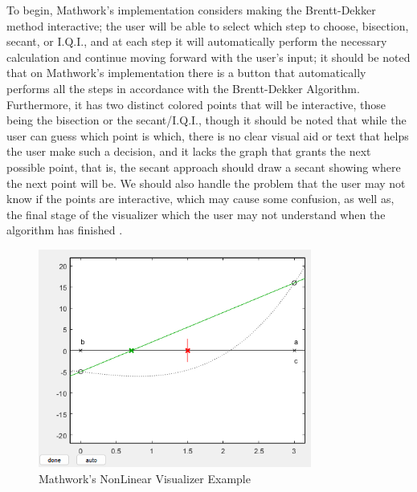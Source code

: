 To begin, Mathwork's implementation considers making the Brentt-Dekker method interactive; the user will be able to select which step to choose, bisection, secant, or I.Q.I., and at each step it will automatically perform the necessary calculation and continue moving forward with the user's input; it should be noted that on Mathwork's implementation there is a button that automatically performs all the steps in accordance with the Brentt-Dekker Algorithm. Furthermore, it has two distinct colored points that will be interactive, those being the bisection or the secant/I.Q.I., though it should be noted that while the user can guess which point is which, there is no clear visual aid or text that helps the user make such a decision, and it lacks the graph that grants the next possible point, that is, the secant approach should draw a secant showing where the next point will be. We should also handle the problem that the user may not know if the points are interactive, which may cause some confusion, as well as, the final stage of the visualizer  which the user may not understand when the algorithm has finished .

\begin{figure}[H]
    \centering
    \includegraphics[width=0.8\textwidth]{Include/Images/Thesis/Development/Visualizers/NON LINEAR VISUALIZER/Mathworks.NonLinear.Ex1.png}
    \caption{Mathwork's \cite{doi:10.1137/1.9780898717952} NonLinear Visualizer Example}
    \label{fig:Mathwork's NonLinear Visualizer Example}
\end{figure}

